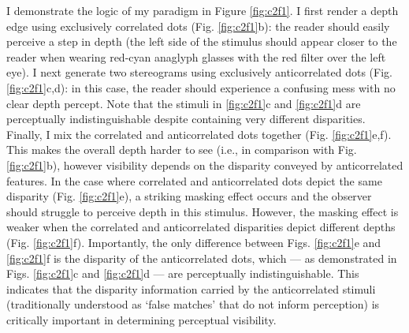 I demonstrate the logic of my paradigm in Figure \ref{fig:c2f1}. I first render a depth edge using exclusively correlated dots (Fig. \ref{fig:c2f1}b): the reader should easily perceive a step in depth (the left side of the stimulus should appear closer to the reader when wearing red-cyan anaglyph glasses with the red filter over the left eye). I next generate two stereograms using exclusively anticorrelated dots (Fig. \ref{fig:c2f1}c,d): in this case, the reader should experience a confusing mess with no clear depth percept. Note that the stimuli in \ref{fig:c2f1}c and \ref{fig:c2f1}d are perceptually indistinguishable despite containing very different disparities. Finally, I mix the correlated and anticorrelated dots together (Fig. \ref{fig:c2f1}e,f). This makes the overall depth harder to see (i.e., in comparison with Fig. \ref{fig:c2f1}b), however visibility depends on the disparity conveyed by anticorrelated features. In the case where correlated and anticorrelated dots depict the same disparity (Fig. \ref{fig:c2f1}e), a striking masking effect occurs and the observer should struggle to perceive depth in this stimulus. However, the masking effect is weaker when the correlated and anticorrelated disparities depict different depths (Fig. \ref{fig:c2f1}f). Importantly, the only difference between Figs. \ref{fig:c2f1}e and \ref{fig:c2f1}f is the disparity of the anticorrelated dots, which --- as demonstrated in Figs. \ref{fig:c2f1}c and \ref{fig:c2f1}d --- are perceptually indistinguishable. This indicates that the disparity information carried by the anticorrelated stimuli (traditionally understood as `false matches' that do not inform perception) is critically important in determining perceptual visibility.

